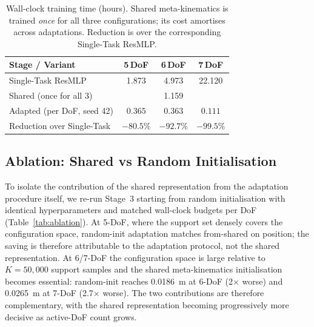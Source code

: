 \documentclass[conference]{IEEEtran}
\begin{document}
\begin{table}[!t]
\renewcommand{\arraystretch}{1.15}
\caption{Wall-clock training time (hours). Shared meta-kinematics is trained \emph{once} for all three configurations; its cost amortises across adaptations. Reduction is over the corresponding Single-Task ResMLP.}
\label{tab:time}
\centering
\footnotesize
\begin{tabular}{lccc}
\toprule
Stage / Variant & 5\,DoF & 6\,DoF & 7\,DoF \\
\midrule
Single-Task ResMLP & 1.873 & 4.973 & 22.120 \\
Shared (once for all 3) & \multicolumn{3}{c}{1.159} \\
Adapted (per DoF, seed 42) & $\mathbf{0.365}$ & $\mathbf{0.363}$ & $\mathbf{0.111}$ \\
\midrule
Reduction over Single-Task & $-80.5\%$ & $-92.7\%$ & $-99.5\%$ \\
\bottomrule
\end{tabular}
\end{table}

\subsection{Ablation: Shared vs Random Initialisation}\label{sec:ablation}

To isolate the contribution of the shared representation from the adaptation procedure itself, we re-run Stage~3 starting from random initialisation with identical hyperparameters and matched wall-clock budgets per DoF (Table~\ref{tab:ablation}). At 5-DoF, where the support set densely covers the configuration space, random-init adaptation matches from-shared on position; the saving is therefore attributable to the adaptation protocol, not the shared representation. At 6/7-DoF the configuration space is large relative to $K\!=\!50{,}000$ support samples and the shared meta-kinematics initialisation becomes essential: random-init reaches 0.0186~m at 6-DoF (2$\times$ worse) and 0.0265~m at 7-DoF (2.7$\times$ worse). The two contributions are therefore complementary, with the shared representation becoming progressively more decisive as active-DoF count grows.
\end{document}
